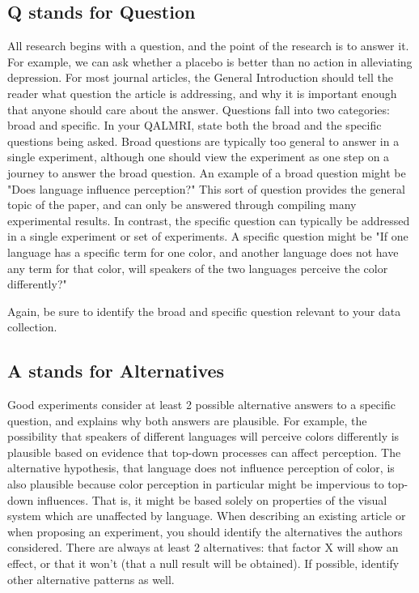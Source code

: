 \subsection{Q stands for Question}

All research begins with a question, and the point of the research is to answer it. For example, we can ask whether a placebo is better than no action in alleviating depression. For most journal articles, the General Introduction should tell the reader what question the article is addressing, and why it is important enough that anyone should care about the answer. Questions fall into two categories: broad and specific. In your QALMRI, state both the broad and the specific questions being asked. Broad questions are typically too general to answer in a single experiment, although one should view the experiment as one step on a journey to answer the broad question. An example of a broad question might be "Does language influence perception?" This sort of question provides the general topic of the paper, and can only be answered through compiling many experimental results. In contrast, the specific question can typically be addressed in a single experiment or set of experiments. A specific question might be "If one language has a specific term for one color, and another language does not have any term for that color, will speakers of the two languages perceive the color differently?" 

Again, be sure to identify the broad and specific question relevant to your data collection. 

\subsection{A stands for Alternatives}

Good experiments consider at least 2 possible alternative answers to a specific question, and explains why both answers are plausible. For example, the possibility that speakers of different languages will perceive colors differently is plausible based on evidence that top-down processes can affect perception. The alternative hypothesis, that language does not influence perception of color, is also plausible because color perception in particular might be impervious to top-down influences. That is, it might be based solely on properties of the visual system which are unaffected by language. When describing an existing article or when proposing an experiment, you should identify the alternatives the authors considered. There are always at least 2 alternatives: that factor X will show an effect, or that it won't (that a null result will be obtained). If possible, identify other alternative patterns as well. 


